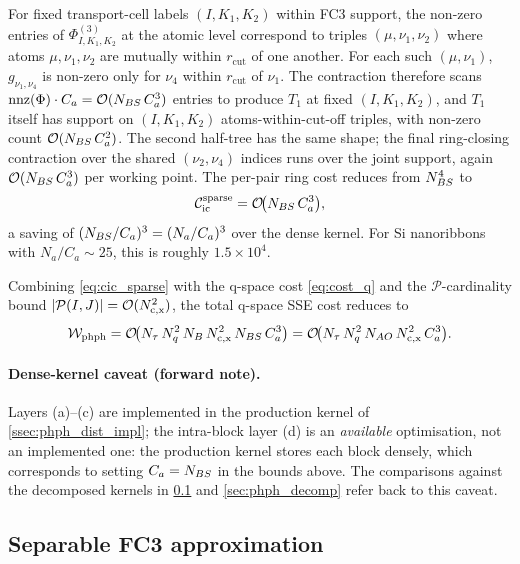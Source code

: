 For fixed transport-cell labels $(I,K_1,K_2)$ within FC3 support, the
non-zero entries of $\Phi^{(3)}_{I,K_1,K_2}$ at the atomic level
correspond to triples $(\mu,\nu_1,\nu_2)$ where atoms $\mu,\nu_1,\nu_2$
are mutually within $r_{\mathrm{cut}}$ of one another. For each such
$(\mu,\nu_1)$, $g_{\nu_1,\nu_4}$ is non-zero only for $\nu_4$ within
$r_{\mathrm{cut}}$ of $\nu_1$. The contraction therefore scans
$\mathrm{nnz}(\Phi)\cdot C_a = \mathcal{O}(N_{BS}\,C_a^{3})$ entries to
produce $T_1$ at fixed $(I,K_1,K_2)$, and $T_1$ itself has support
on $(I,K_1,K_2)$ atoms-within-cut-off triples, with non-zero count
$\mathcal{O}(N_{BS}\,C_a^{2})$. The second half-tree has the same shape; the
final ring-closing contraction over the shared $(\nu_2,\nu_4)$
indices runs over the joint support, again $\mathcal{O}(N_{BS}\,C_a^{3})$ per
working point. The per-pair ring cost reduces from $N_{BS}^{4}$ to
\begin{equation}\label{eq:cic_sparse}
  \mathcal{C}_\mathrm{ic}^\mathrm{sparse}
  = \mathcal{O}\!\bigl(N_{BS}\,C_a^{3}\bigr),
\end{equation}
a saving of $(N_{BS}/C_a)^{3} = (N_a/C_a)^{3}$ over the dense kernel.
For Si nanoribbons with $N_a/C_a\sim 25$, this is roughly $1.5\times
10^{4}$.

Combining \cref{eq:cic_sparse} with the q-space cost
\cref{eq:cost_q} and the $\mathcal{P}$-cardinality bound
$|\mathcal{P}(I,J)|=\mathcal{O}(N_\mathrm{c,x}^{2})$, the total q-space SSE
cost reduces to
\begin{equation}\label{eq:cost_phph_total}
  \mathcal{W}_\mathrm{phph}
  = \mathcal{O}\!\bigl(N_\tau\,N_q^{2}\,N_{B}\,N_\mathrm{c,x}^{2}\,
               N_{BS}\,C_a^{3}\bigr)
  = \mathcal{O}\!\bigl(N_\tau\,N_q^{2}\,N_{AO}\,N_\mathrm{c,x}^{2}\,
               C_a^{3}\bigr).
\end{equation}

\paragraph{Dense-kernel caveat (forward note).} Layers (a)--(c) are
implemented in the production kernel of \cref{ssec:phph_dist_impl};
the intra-block layer (d) is an \emph{available} optimisation, not an
implemented one: the production kernel stores each block densely,
which corresponds to setting $C_a=N_{BS}$ in the bounds above. The
comparisons against the decomposed kernels in
\cref{ssec:phph_separable} and \cref{sec:phph_decomp} refer back to
this caveat.

\subsection{Separable FC3 approximation}
\label{ssec:phph_separable}

